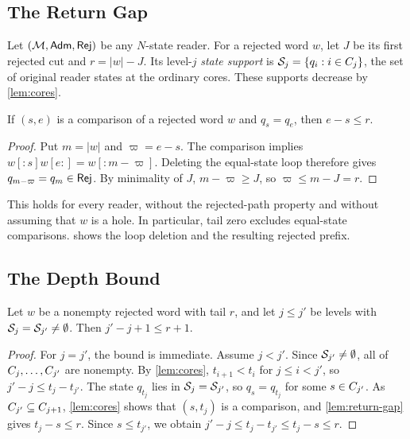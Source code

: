 \subsection{The Return Gap}
Let $(\mathcal M,\mathsf{Adm},\mathsf{Rej})$ be any $N$-state reader. For a rejected
word $w$, let $J$ be its first rejected cut and $r=|w|-J$.
Its level-$j$ \emph{state support} is $\mathcal S_j=\{q_i:i\in C_j\}$, the set of
original reader states at the ordinary cores. These supports decrease by \cref{lem:cores}.

\begin{lemma}\label{lem:return-gap}
If $(s,e)$ is a comparison of a rejected word $w$ and $q_s=q_e$, then
$e-s\le r$.
\end{lemma}
\begin{proof}
Put $m=|w|$ and $\varpi=e-s$. The comparison implies
$w[:s]w[e:]=w[:m-\varpi]$. Deleting the equal-state loop therefore gives
$q_{m-\varpi}=q_m\in\mathsf{Rej}$. By minimality of $J$, $m-\varpi\ge J$,
so $\varpi\le m-J=r$.
\end{proof}
This holds for every reader, without the rejected-path property and without
assuming that $w$ is a hole. In particular, tail zero excludes equal-state comparisons.
 shows the loop deletion and the resulting rejected prefix.


\subsection{The Depth Bound}

\begin{lemma}\label{lem:width}
Let $w$ be a nonempty rejected word with tail $r$, and let $j \le j'$ be levels with
$\mathcal S_j = \mathcal S_{j'} \ne \emptyset$. Then $j' - j + 1 \le r+1$.
\end{lemma}

\begin{proof}
For $j=j'$, the bound is immediate. Assume $j < j'$. Since $\mathcal S_{j'} \neq \emptyset$, all of $C_j, \dots, C_{j'}$ are nonempty.
By \cref{lem:cores}, $t_{i+1} < t_i$ for $j \le i < j'$, so $j' - j \le t_j - t_{j'}$. The state
$q_{t_j}$ lies in $\mathcal S_j = \mathcal S_{j'}$, so $q_s = q_{t_j}$ for some $s \in C_{j'}$.
As $C_{j'} \subseteq C_{j+1}$, \cref{lem:cores} shows that $(s,t_j)$ is a comparison,
and \cref{lem:return-gap} gives $t_j - s \le r$. Since $s \le t_{j'}$, we obtain
$j' - j \le t_j - t_{j'} \le t_j - s \le r$.
\end{proof}


